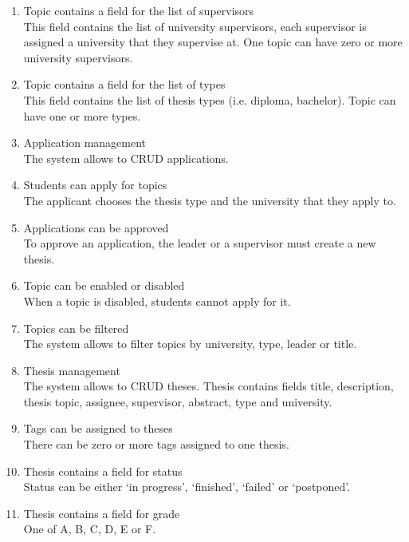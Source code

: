 \begin{enumerate}
    \item Topic contains a field for the list of supervisors\\
    This field contains the list of university supervisors, each supervisor is assigned a university that they supervise at. One topic can have zero or more university supervisors.

    \item Topic contains a field for the list of types\\
    This field contains the list of thesis types (i.e. diploma, bachelor). Topic can have one or more types.

    \item Application management\\
    The system allows to CRUD applications.

    \item Students can apply for topics\\
    The applicant chooses the thesis type and the university that they apply to.

    \item Applications can be approved\\
    To approve an application, the leader or a supervisor must create a new thesis.

    \item Topic can be enabled or disabled\\
    When a topic is disabled, students cannot apply for it.

    \item Topics can be filtered\\
    The system allows to filter topics by university, type, leader or title.

    \item Thesis management\\
    The system allows to CRUD theses. Thesis contains fields title, description, thesis topic, assignee, supervisor, abstract, type and university.

    \item Tags can be assigned to theses\\
    There can be zero or more tags assigned to one thesis.

    \item Thesis contains a field for status\\
    Status can be either `in progress', `finished', `failed' or `postponed'.

    \item Thesis contains a field for grade\\
    One of A, B, C, D, E or F.


\end{enumerate}
